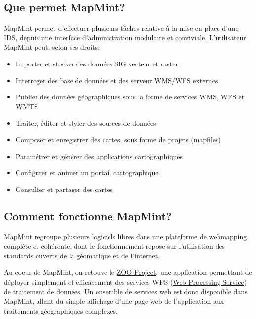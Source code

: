 \documentclass[letterpaper,10pt,french]{sphinxmanual}
\begin{document}
\subsection{Que permet MapMint?}
\label{introduction/introduction:que-permet-mapmint}
MapMint permet d'effectuer plusieurs tâches relative à la mise en place d'une IDS, depuis une interface d'administration modulaire et conviviale. L'utilisateur MapMint peut, selon ses droits:
\begin{itemize}
\item {} 
Importer et stocker des données SIG vecteur et raster

\item {} 
Interroger des base de données et des serveur WMS/WFS externes

\item {} 
Publier des données géographiques sous la forme de services WMS, WFS et WMTS

\item {} 
Traiter, éditer et styler des sources de données

\item {} 
Composer et enregistrer des cartes, sous forme de projets (mapfiles)

\item {} 
Paramétrer et générer des applications cartographiques

\item {} 
Configurer et animer un portail cartographique

\item {} 
Consulter et partager des cartes

\end{itemize}


\subsection{Comment fonctionne MapMint?}
\label{introduction/introduction:comment-fonctionne-mapmint}
MapMint regroupe plusieurs \href{http://mapmint.com/en/Components}{logiciels libres} dans une plateforme de
webmapping complète et cohérente, dont le fonctionnement repose sur
l'utilisation des \href{http://mapmint.com/en/Components}{standards ouverts} de la géomatique et de
l'internet.

Au coeur de MapMint, on retouve le \href{http://zoo-project.org}{ZOO-Project}, une application
permettant de déployer simplement et efficacement des services
WPS (\href{http://www.opengeospatial.org/standards/wps}{Web Processing Service}) de traitement de
données. Un ensemble de services web est donc disponible dans MapMint,
allant du simple affichage d'une page web de l'application aux
traitements géographiques complexes.
\end{document}
